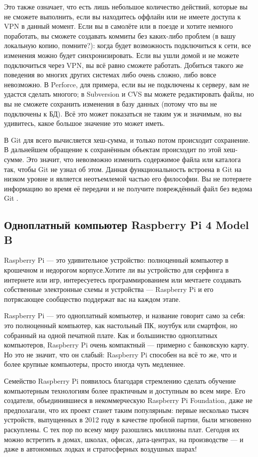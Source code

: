 Это также означает, что есть лишь небольшое количество действий, которые вы не сможете выполнить, если вы находитесь оффлайн или не имеете доступа к VPN в данный момент. Если вы в самолёте или в поезде и хотите немного поработать, вы сможете создавать коммиты без каких-либо проблем (в вашу локальную копию, помните?): когда будет возможность подключиться к сети, все изменения можно будет синхронизировать. Если вы ушли домой и не можете подключиться через VPN, вы всё равно сможете работать.
Добиться такого же поведения во многих других системах либо очень сложно, либо вовсе
невозможно. В Perforce, для примера, если вы не подключены к серверу, вам не удастся
сделать многого; в Subversion и CVS вы можете редактировать файлы, но вы не сможете
сохранить изменения в базу данных (потому что вы не подключены к БД). Всё это может
показаться не таким уж и значимым, но вы удивитесь, какое большое значение это может
иметь.

В Git для всего вычисляется хеш-сумма, и только потом происходит сохранение. В
дальнейшем обращение к сохранённым объектам происходит по этой хеш-сумме. Это
значит, что невозможно изменить содержимое файла или каталога так, чтобы Git не узнал
об этом. Данная функциональность встроена в Git на низком уровне и является
неотъемлемой частью его философии. Вы не потеряете информацию во время её передачи и
не получите повреждённый файл без ведома Git \cite{ProGit}.

\subsection{Одноплатный компьютер Raspberry Pi 4 Model B}

Raspberry Pi — это удивительное устройство: полноценный компьютер в крошечном и недорогом корпусе.Хотите ли вы устройство для серфинга в интернете или игр, интересуетесь программированием или мечтаете создавать собственные электронные схемы и устройства — Raspberry Pi и его потрясающее сообщество поддержат вас на каждом этапе.

Raspberry Pi — это одноплатный компьютер, и название говорит само за себя:
это полноценный компьютер, как настольный ПК, ноутбук или смартфон, но собранный на одной печатной плате. Как и большинство одноплатных компьютеров, Raspberry Pi очень компактный — примерно с банковскую карту. Но это не значит, что он слабый: Raspberry Pi способен на всё то же, что и более крупные компьютеры, просто иногда чуть медленнее.

Семейство Raspberry Pi появилось благодаря стремлению сделать обучение компьютерным технологиям более практичным и доступным во всем мире. Его создатели, объединившиеся в некоммерческую Raspberry Pi Foundation, даже не предполагали, что их проект станет таким популярным: первые несколько тысяч устройств, выпущенных в 2012 году в качестве пробной партии, были мгновенно раскуплены. С тех пор по всему миру разошлись миллионы плат. Сегодня их можно встретить в домах, школах, офисах, дата-центрах, на производстве — и даже в автономных лодках и стратосферных воздушных шарах!

